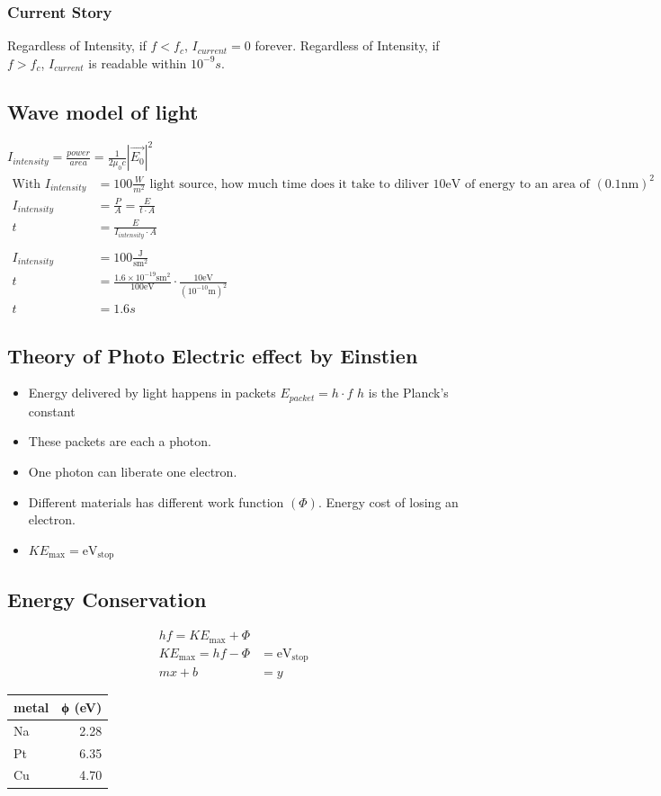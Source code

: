\documentclass[11pt]{article}
\begin{document}
\subsubsection{Current Story}
\label{sec:org62aaaf7}
Regardless of Intensity, if \(f < f_c\), \(I_{current} = 0\) forever.
Regardless of Intensity, if \(f > f_c\), \(I_{current}\) is readable within \(10^{-9} s\).
\subsection{Wave model of light}
\label{sec:org43db123}
\(I_{intensity} = \frac{power}{area} = \frac{1}{2 \mu_0 c} |\overrightarrow{E_{0}}|^2\)
\begin{align*}
\text{With }I_{intensity} &= 100 \frac{W}{m^2} \text{ light source, how much time does it take to diliver } 10\mathrm{eV} \text{ of energy to an area of } (0.1\mathrm{nm})^2 \\
I_{intensity} &= \frac{P}{A} = \frac{E}{t \cdot A} \\
t &= \frac{E}{I_{intensity} \cdot A} \\ \\
I_{intensity} &= 100 \frac{\mathrm{J}}{\mathrm{sm}^2} \\
t &= \frac{1.6 \times 10^{-19}\mathrm{sm}^2}{100 \mathrm{eV}} \cdot \frac{10 \mathrm{eV}}{(10^{-10} \mathrm{m})^2} \\
t &= 1.6 s
\end{align*}
\subsection{Theory of Photo Electric effect by Einstien}
\label{sec:org37d95c7}
\begin{itemize}
\item Energy delivered by light happens in packets \(E_{packet} = h \cdot f\)
\(h\) is the Planck's constant
\item These packets are each a photon.
\item One photon can liberate one electron.
\item Different materials has different work function \((\Phi)\). Energy cost of losing an electron.
\item \(KE_{\mathrm{max}} = \mathrm{eV_{\mathrm{stop}}}\)
\end{itemize}
\subsection{Energy Conservation}
\label{sec:org03f189d}
\begin{align*}
hf = KE_{\mathrm{max}} + \Phi \\
KE_{\mathrm{max}} = hf - \Phi &= \mathrm{eV_{stop}} \\
mx + b &= y
\end{align*}
\begin{center}
\begin{tabular}{lr}
\hline
metal & ϕ (eV)\\
\hline
Na & 2.28\\
Pt & 6.35\\
Cu & 4.70\\
\hline
\end{tabular}
\end{center}
\end{document}
